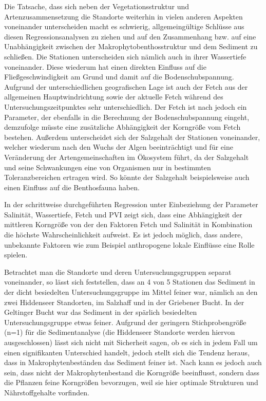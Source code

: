 Die Tatsache, dass sich neben der Vegetationsstruktur und Artenzusammensetzung die Standorte weiterhin in vielen anderen Aspekten voneinander unterscheiden macht es schwierig, allgemeingültige Schlüsse aus diesen Regressionsanalysen zu ziehen und auf den Zusammenhang bzw. auf eine Unabhängigkeit zwischen der Makrophytobenthosstruktur und dem Sediment zu schließen. Die Stationen unterscheiden sich nämlich auch in ihrer Wassertiefe voneinander. Diese wiederum hat einen direkten Einfluss auf die Fließgeschwindigkeit am Grund und damit auf die Bodenschubspannung. Aufgrund der unterschiedlichen geografischen Lage ist auch der Fetch aus der allgemeinen Hauptwindrichtung sowie der aktuelle Fetch während des Untersuchungszeitpunktes sehr unterschiedlich. Der Fetch ist nach \cite{laenen_1996} jedoch ein Parameter, der ebenfalls in die Berechnung der Bodenschubspannung eingeht, demzufolge müsste eine zusätzliche Abhängigkeit der Korngröße vom Fetch bestehen. Außerdem unterscheidet sich der Salzgehalt der Stationen voneinander, welcher wiederum nach \cite{schwenke_1995}  den Wuchs der Algen beeinträchtigt und für eine Veränderung der Artengemeinschaften im Ökosystem führt, da der Salzgehalt und seine Schwankungen eine von Organismen nur in bestimmten Toleranzbereichen ertragen wird. So könnte der Salzgehalt beispielsweise auch einen Einfluss auf die Benthosfauna haben.

In der schrittweise durchgeführten Regression unter Einbeziehung der Parameter Salinität, Wassertiefe, Fetch und PVI zeigt sich, dass eine Abhängigkeit der mittleren Korngröße von der den Faktoren Fetch und Salinität in Kombination die höchste Wahrscheinlichkeit aufweist. Es ist jedoch möglich, dass andere, unbekannte Faktoren wie zum Beispiel anthropogene lokale Einflüsse eine Rolle spielen.

Betrachtet man die Standorte und deren Untersuchungsgruppen separat voneinander, so lässt sich feststellen, dass  an 4 von 5 Stationen das Sediment in der dicht besiedelten Untersuchungsgruppe im Mittel feiner war, nämlich an den zwei Hiddenseer Standorten, im Salzhaff und in der Griebener Bucht. In der Geltinger Bucht war das Sediment in der spärlich besiedelten Untersuchungsgruppe etwas feiner. Aufgrund der geringern Stichprobengröße (n=1) für die Sedimentanalyse (die Hiddenseer Standorte werden hiervon ausgeschlossen) lässt sich nicht mit Sicherheit sagen, ob es sich in jedem Fall um einen signifikanten Unterschied handelt, jedoch stellt sich die Tendenz heraus, dass in Makrophytenbeständen das Sediment feiner ist. Nach \cite{lindner_1978} kann es jedoch auch sein, dass nicht der Makrophytenbestand die Korngröße beeinflusst, sondern dass die Pflanzen feine Korngrößen bevorzugen, weil sie hier optimale Strukturen und Nährstoffgehalte vorfinden.

